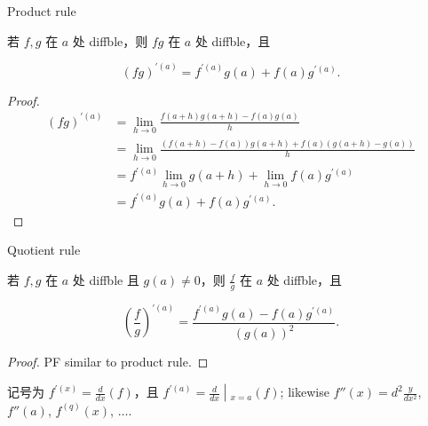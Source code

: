 \begin{theorem}{Product rule}

若 \(f,g\) 在 \(a\) 处 diffble，则 \(fg\) 在 \(a\) 处 diffble，且

\[\left( {fg} \right)^{'{(a)}} = f^{'{(a)}}g(a) + f(a)g^{'{(a)}}.\]

\end{theorem}

\begin{proof}

\[\begin{matrix}
\left( {fg} \right)^{'{(a)}} & {= \lim\limits_{h\rightarrow 0}\frac{f\left( {a + h} \right)g\left( {a + h} \right) - f(a)g(a)}{h}} \\
 & {= \lim\limits_{h\rightarrow 0}\frac{\left( {f\left( {a + h} \right) - f(a)} \right)g\left( {a + h} \right) + f(a)\left( {g\left( {a + h} \right) - g(a)} \right)}{h}} \\
 & {= f^{'{(a)}}\lim\limits_{h\rightarrow 0}g\left( {a + h} \right) + \lim\limits_{h\rightarrow 0}f(a)g^{'{(a)}}} \\
 & {= f^{'{(a)}}g(a) + f(a)g^{'{(a)}}.}
\end{matrix}\]

\end{proof}

\begin{theorem}{Quotient rule}

若 \(f,g\) 在 \(a\) 处 diffble 且 \(g(a) \neq 0\)，则 \(\frac{f}{g}\) 在 \(a\) 处 diffble，且

\[\left( \frac{f}{g} \right)^{'{(a)}} = \frac{f^{'{(a)}}g(a) - f(a)g^{'{(a)}}}{\left( {g(a)} \right)^{2}}.\]

\end{theorem}

\begin{proof}

PF similar to product rule.

\end{proof}

记号为 \(f^{'{(x)}} = \frac{d}{dx}(f)\)，且 \(\left. f^{'{(a)}} = \frac{d}{dx} \middle| {}_{x = a}(f) \right.\); likewise \(f''(x) = d^{2}\frac{y}{dx^{2}}\), \(f''(a)\), \(f^{(q)}(x)\), \(\ldots\).

